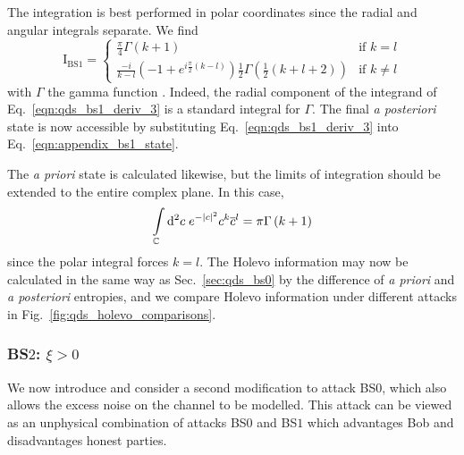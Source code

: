 The integration is best performed in polar coordinates since the radial and angular integrals separate. We find
\begin{equation}\label{eqn:qds_bs1_deriv_3}
\text{I}_{\text{BS}1} =
\begin{cases}
\frac{\pi}{4} \Gamma\left(k+1\right) & \text{if } k = l \\
\frac{-i}{k-l}\left(-1 + e^{i \frac{\pi}{2}\left(k-l\right)}\right)\frac{1}{2}\Gamma\left(\frac{1}{2}\left(k + l + 2\right) \right) & \text{if } k \ne l
\end{cases}
\end{equation}
with $\Gamma$ the gamma function \cite{mathworld_gamma}. Indeed, the radial component of the integrand of Eq.~\ref{eqn:qds_bs1_deriv_3} is a standard integral for $\Gamma$. The final \emph{a posteriori} state is now accessible by substituting Eq.~\ref{eqn:qds_bs1_deriv_3} into Eq.~\ref{eqn:appendix_bs1_state}.%

The \emph{a priori} state is calculated likewise, but the limits of integration should be extended to the entire complex plane. In this case,
\begin{equation}\label{eqn:qds_bs1_deriv_4}
\int\limits_{\mathbb{C}} \mathop{}\!\mathrm{d^2} c \; e^{-\left|c\right|^2}c^k \overline{c}^l = \pi \Gamma\left(k+1\right)
\end{equation}
since the polar integral forces $k=l$.
The Holevo information may now be calculated in the same way as Sec.~\ref{sec:qds_bs0} by the difference of \emph{a priori} and \emph{a posteriori} entropies, and we compare Holevo information under different attacks in Fig.~\ref{fig:qds_holevo_comparisons}.

\subsubsection{BS$2$: $\xi > 0$}\label{sec:qds_bs2}
We now introduce and consider a second modification to attack BS$0$, which also allows the excess noise on the channel to be modelled. This attack can be viewed as an unphysical combination of attacks BS$0$ and BS$1$ which advantages Bob and disadvantages honest parties.

